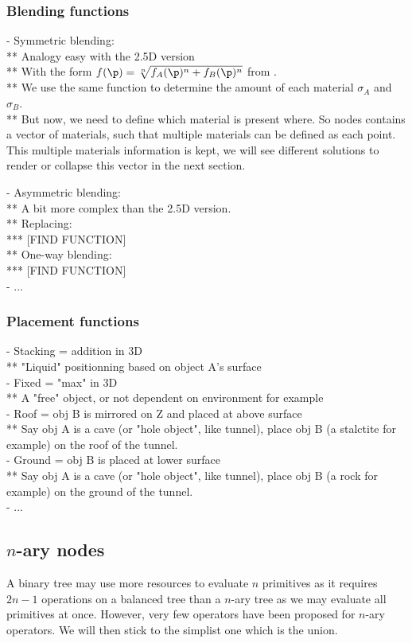 \subsubsection{Blending functions}
- Symmetric blending: \\
** Analogy easy with the 2.5D version \\
** With the form $f(\p) = \sqrt[n]{f_A(\p)^n + f_B(\p)^n}$ from \cite{Bernhardt2010}. \\
** We use the same function to determine the amount of each material $\sigma_A$ and $\sigma_B$. \\
** But now, we need to define which material is present where. So nodes contains a vector of materials, such that multiple materials can be defined as each point. This multiple materials information is kept, we will see different solutions to render or collapse this vector in the next section.

- Asymmetric blending: \\
** A bit more complex than the 2.5D version. \\
** Replacing: \\
*** [FIND FUNCTION] \\
** One-way blending: \\
*** [FIND FUNCTION] \\
- ...

\subsubsection{Placement functions}
- Stacking = addition in 3D \\
** "Liquid" positionning based on object A's surface \\
- Fixed = "max" in 3D \\
** A "free" object, or not dependent on environment for example \\
- Roof = obj B is mirrored on Z and placed at above surface \\
** Say obj A is a cave (or "hole object", like tunnel), place obj B (a stalctite for example) on the roof of the tunnel. \\
- Ground = obj B is placed at lower surface \\
** Say obj A is a cave (or "hole object", like tunnel), place obj B (a rock for example) on the ground of the tunnel. \\
- ...

\subsection{$n$-ary nodes}
A binary tree may use more resources to evaluate $n$ primitives as it requires $2 n - 1$ operations on a balanced tree than a $n$-ary tree as we may evaluate all primitives at once. However, very few operators have been proposed for $n$-ary operators. We will then stick to the simplist one which is the union.


